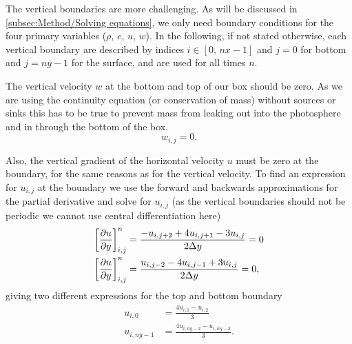 \documentclass[11pt,a4paper,twocolumn,titlepage]{article}
\newcommand{\disc}[1]    %
{
\ensuremath
\qty[#1]_{i,j}^{n}
}
\begin{document}
The vertical boundaries are more challenging. As will be discussed in \cref{subsec:Method/Solving equations}, we only need boundary conditions for the four primary variables ($\rho,\,e,\,u,\,w$). In the following, if not stated otherwise, each vertical boundary are described by indices $i\in[0,\,nx-1]$ and $j = 0$ for bottom and $j=ny-1$ for the surface, and are used for all times $n$.

The vertical velocity $w$ at the bottom and top of our box should be zero. As we are using the continuity equation (or conservation of mass) without sources or sinks this has to be true to prevent mass from leaking out into the photosphere and in through the bottom of the box.
\begin{equation}
w_{i,j} = 0.
\label{eq:Boundary w}
\end{equation}

Also, the vertical gradient of the horizontal velocity $u$ must be zero at the boundary, for the same reasons as for the vertical velocity. To find an expression for $u_{i,j}$ at the boundary we use the forward and backwards approximations for the partial derivative and solve for $u_{i,j}$ (as the vertical boundaries should not be periodic we cannot use central differentiation here)
\begin{align*}
\disc{\pdv{u}{y}} &= \frac{-u_{i,j+2}+4u_{i,j+1}-3u_{i,j}}{2\Delta y}=0
\\
\disc{\pdv{u}{y}} &= \frac{u_{i,j-2}-4u_{i,j-1}+3u_{i,j}}{2\Delta y}=0,
\end{align*}
giving two different expressions for the top and bottom boundary
\begin{equation}
\begin{aligned}
u_{i,0} &= \frac{4u_{i,1}-u_{i,2}}{3}
\\
u_{i,ny-1} &= \frac{4u_{i,ny-2}-u_{i,ny-3}}{3}.
\end{aligned}
\label{eq:Boundary u}
\end{equation}
\end{document}
